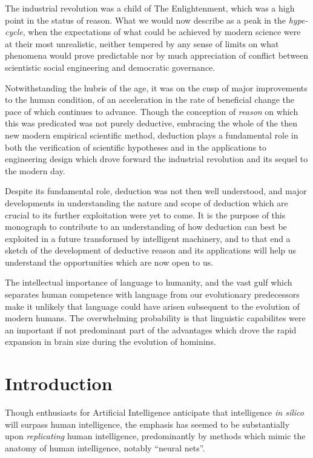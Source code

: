 \documentclass[10pt,titlepage]{book}
\begin{document}
The industrial revolution was a child of The Enlightenment, which was a high point in the status of reason.
What we would now describe as a peak in the \emph{hype-cycle}, when the expectations of what could be achieved by modern science were at their most unrealistic, neither tempered by any sense of limits on what phenomena would prove predictable nor by much appreciation of conflict between scientistic social engineering and democratic governance.

Notwithstanding the hubris of the age, it was on the cusp of major improvements to the human condition, of an acceleration in the rate of beneficial change the pace of which continues to advance.
Though the conception of \emph{reason} on which this was predicated was not purely deductive, embracing the whole of the then new modern empirical scientific method, deduction plays a fundamental role in both the verification of scientific hypotheses and in the applications to engineering design which drove forward the industrial revolution and its sequel to the modern day.

Despite its fundamental role, deduction was not then well understood, and major developments in understanding the nature and scope of deduction which are crucial to its further exploitation were yet to come.
It is the purpose of this monograph to contribute to an understanding of how deduction can best be exploited in a future transformed by intelligent machinery, and to that end a sketch of the development of deductive reason and its applications will help us understand the opportunities which are now open to us.

The intellectual importance of language to humanity, and the vast gulf which separates human competence with language from our evolutionary predecessors make it unlikely that language could have arisen subsequent to the evolution of modern humans.
The overwhelming probability is that linguistic capabilites were an important if not predominant part of the advantages which drove the rapid expansion in brain size during the evolution of hominins.

\chapter{Introduction}

Though enthusiasts for Artificial Intelligence anticipate that intelligence \emph{in silico} will surpass human intelligence, the emphasis has seemed to be substantially upon \emph{replicating} human intelligence, predominantly by methods which mimic the anatomy of human intelligence, notably ``neural nets''.
\end{document}
